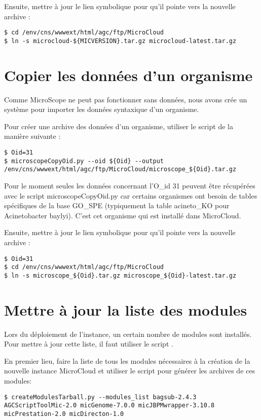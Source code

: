 Ensuite, mettre à jour le lien symbolique pour qu'il pointe vers la nouvelle archive :
\begin{lstlisting}[style=bash]
$ cd /env/cns/wwwext/html/agc/ftp/MicroCloud
$ ln -s microcloud-${MICVERSION}.tar.gz microcloud-latest.tar.gz
\end{lstlisting}

\section{Copier les données d'un organisme} \label{sec:nouvelle_donne_organisme}

Comme MicroScope ne peut pas fonctionner sans données, nous avons crée un système
pour importer les données syntaxique d'un organisme.

Pour créer une archive des données d'un organisme, utiliser le script  de la manière suivante :
\begin{lstlisting}[style=bash]
$ Oid=31
$ microscopeCopyOid.py --oid ${Oid} --output /env/cns/wwwext/html/agc/ftp/MicroCloud/microscope_${Oid}.tar.gz
\end{lstlisting}

\begin{mycolorbox}
    Pour le moment seules les données concernant l'O\_id 31 peuvent être récupérées avec le script microscopeCopyOid.py car certains organismes ont besoin de tables spécifiques de la base GO\_SPE (typiquement la table acineto\_KO pour Acinetobacter baylyi).
    C'est cet organisme qui est installé dans MicroCloud.
\end{mycolorbox}

Ensuite, mettre à jour le lien symbolique pour qu'il pointe vers la nouvelle archive :
\begin{lstlisting}[style=bash]
$ Oid=31
$ cd /env/cns/wwwext/html/agc/ftp/MicroCloud
$ ln -s microscope_${Oid}.tar.gz microscope_${Oid}-latest.tar.gz
\end{lstlisting}

\section{Mettre à jour la liste des modules} \label{sec:nouvelle_liste_modules}

Lors du déploiement de l'instance, un certain nombre de modules sont installés.
Pour mettre à jour cette liste, il faut utiliser le script .

En premier lieu, faire la liste de tous les modules nécessaires à la création de la nouvelle instance MicroCloud et utiliser
le script  pour générer les archives de ces modules:
\begin{lstlisting}[style=bash]
$ createModulesTarball.py --modules_list bagsub-2.4.3 AGCScriptToolMic-2.0 micGenome-7.0.0 micJBPMwrapper-3.10.8 micPrestation-2.0 micDirecton-1.0
\end{lstlisting}

